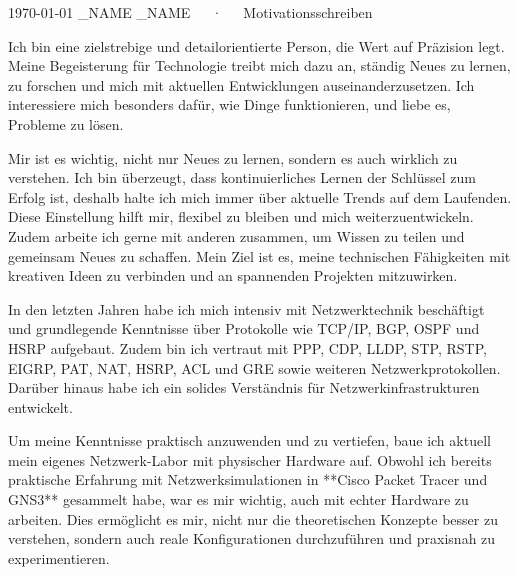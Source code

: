 \documentclass[11pt, a4paper]{awesome-cv}
\begin{document}
\makecvheader[R]

\makecvfooter
  {\today}
  {\FIRST_NAME \LAST_NAME~~~·~~~Motivationsschreiben}
  {}

\makelettertitle

\begin{cvletter}
	


Ich bin eine zielstrebige und detailorientierte Person, die Wert auf Präzision legt. Meine Begeisterung für Technologie treibt mich dazu an, ständig Neues zu lernen, zu forschen und mich mit aktuellen Entwicklungen auseinanderzusetzen. Ich interessiere mich besonders dafür, wie Dinge funktionieren, und liebe es, Probleme zu lösen.

Mir ist es wichtig, nicht nur Neues zu lernen, sondern es auch wirklich zu verstehen. Ich bin überzeugt, dass kontinuierliches Lernen der Schlüssel zum Erfolg ist, deshalb halte ich mich immer über aktuelle Trends auf dem Laufenden. Diese Einstellung hilft mir, flexibel zu bleiben und mich weiterzuentwickeln. Zudem arbeite ich gerne mit anderen zusammen, um Wissen zu teilen und gemeinsam Neues zu schaffen. Mein Ziel ist es, meine technischen Fähigkeiten mit kreativen Ideen zu verbinden und an spannenden Projekten mitzuwirken.


In den letzten Jahren habe ich mich intensiv mit Netzwerktechnik beschäftigt und grundlegende Kenntnisse über Protokolle wie TCP/IP, BGP, OSPF und HSRP aufgebaut. Zudem bin ich vertraut mit PPP, CDP, LLDP, STP, RSTP, EIGRP, PAT, NAT, HSRP, ACL und GRE sowie weiteren Netzwerkprotokollen. Darüber hinaus habe ich ein solides Verständnis für Netzwerkinfrastrukturen entwickelt.

Um meine Kenntnisse praktisch anzuwenden und zu vertiefen, baue ich aktuell mein eigenes Netzwerk-Labor mit physischer Hardware auf. Obwohl ich bereits praktische Erfahrung mit Netzwerksimulationen in **Cisco Packet Tracer und GNS3** gesammelt habe, war es mir wichtig, auch mit echter Hardware zu arbeiten. Dies ermöglicht es mir, nicht nur die theoretischen Konzepte besser zu verstehen, sondern auch reale Konfigurationen durchzuführen und praxisnah zu experimentieren.


\end{cvletter}
\end{document}
